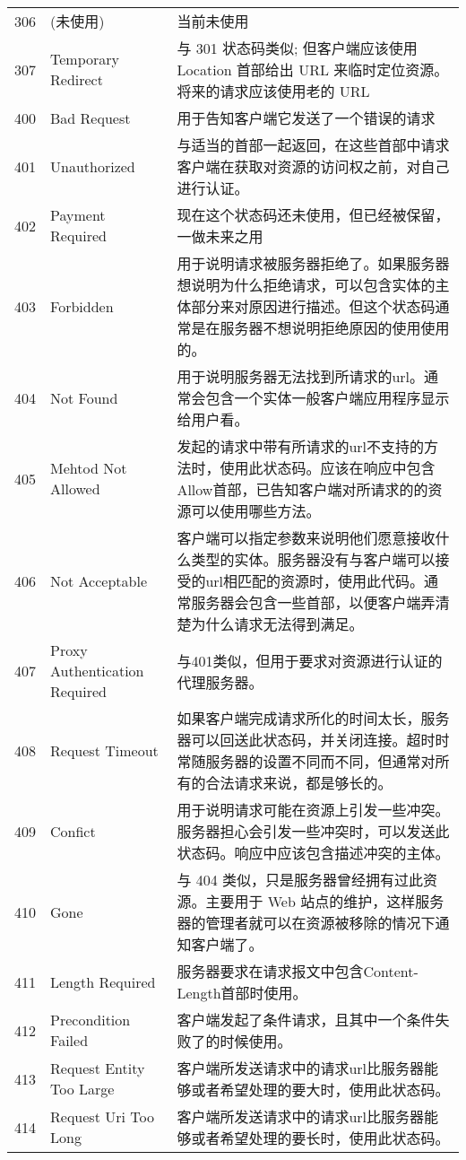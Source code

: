 \begin{longtable}{|c|l|l|}
306 & (未使用) & 当前未使用\\
307 & Temporary Redirect & 与 301 状态码类似; 但客户端应该使用 Location 首部给出 URL 来临时定位资源。将来的请求应该使用老的 URL\\
400 & Bad Request & 用于告知客户端它发送了一个错误的请求\\
401 & Unauthorized & 与适当的首部一起返回，在这些首部中请求客户端在获取对资源的访问权之前，对自己进行认证。\\
402 & Payment Required & 现在这个状态码还未使用，但已经被保留，一做未来之用\\
403 & Forbidden & 用于说明请求被服务器拒绝了。如果服务器想说明为什么拒绝请求，可以包含实体的主体部分来对原因进行描述。但这个状态码通常是在服务器不想说明拒绝原因的使用使用的。\\
404 & Not Found & 用于说明服务器无法找到所请求的url。通常会包含一个实体一般客户端应用程序显示给用户看。\\
405 & Mehtod Not Allowed & 发起的请求中带有所请求的url不支持的方法时，使用此状态码。应该在响应中包含Allow首部，已告知客户端对所请求的的资源可以使用哪些方法。\\
406 & Not Acceptable & 客户端可以指定参数来说明他们愿意接收什么类型的实体。服务器没有与客户端可以接受的url相匹配的资源时，使用此代码。通常服务器会包含一些首部，以便客户端弄清楚为什么请求无法得到满足。\\
407 & Proxy Authentication Required & 与401类似，但用于要求对资源进行认证的代理服务器。\\
408 & Request Timeout & 如果客户端完成请求所化的时间太长，服务器可以回送此状态码，并关闭连接。超时时常随服务器的设置不同而不同，但通常对所有的合法请求来说，都是够长的。\\
409 & Confict & 用于说明请求可能在资源上引发一些冲突。服务器担心会引发一些冲突时，可以发送此状态码。响应中应该包含描述冲突的主体。\\
410 & Gone & 与 404 类似，只是服务器曾经拥有过此资源。主要用于 Web 站点的维护，这样服务器的管理者就可以在资源被移除的情况下通知客户端了。\\
411 & Length Required & 服务器要求在请求报文中包含Content-Length首部时使用。\\
412 & Precondition Failed & 客户端发起了条件请求，且其中一个条件失败了的时候使用。\\
413 & Request Entity Too Large & 客户端所发送请求中的请求url比服务器能够或者希望处理的要大时，使用此状态码。\\
414 & Request Uri Too Long & 客户端所发送请求中的请求url比服务器能够或者希望处理的要长时，使用此状态码。\\

\end{longtable}
